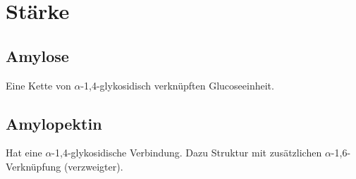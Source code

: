 \section{Stärke}

\subsection{Amylose}
Eine Kette von $\alpha$-1,4-glykosidisch verknüpften Glucoseeinheit. 

\subsection{Amylopektin}
Hat eine $\alpha$-1,4-glykosidische Verbindung. 
Dazu Struktur mit zusätzlichen $\alpha$-1,6-Verknüpfung (verzweigter).
